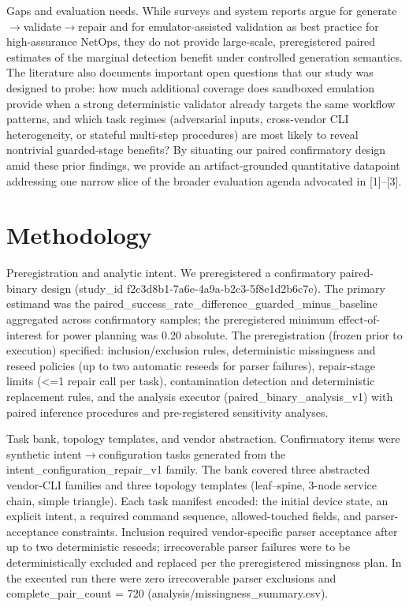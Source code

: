 \documentclass[conference]{IEEEtran}
\begin{document}
Gaps and evaluation needs. While surveys and system reports argue for generate\ensuremath{\rightarrow}validate\ensuremath{\rightarrow}repair and for emulator-assisted validation as best practice for high-assurance NetOps, they do not provide large-scale, preregistered paired estimates of the marginal detection benefit under controlled generation semantics. The literature also documents important open questions that our study was designed to probe: how much additional coverage does sandboxed emulation provide when a strong deterministic validator already targets the same workflow patterns, and which task regimes (adversarial inputs, cross‑vendor CLI heterogeneity, or stateful multi-step procedures) are most likely to reveal nontrivial guarded-stage benefits? By situating our paired confirmatory design amid these prior findings, we provide an artifact-grounded quantitative datapoint addressing one narrow slice of the broader evaluation agenda advocated in [1]--[3].

\section{Methodology}
Preregistration and analytic intent. We preregistered a confirmatory paired-binary design (study\_id f2c3d8b1-7a6e-4a9a-b2c3-5f8e1d2b6c7e). The primary estimand was the paired\_success\_rate\_difference\_guarded\_minus\_baseline aggregated across confirmatory samples; the preregistered minimum effect-of-interest for power planning was 0.20 absolute. The preregistration (frozen prior to execution) specified: inclusion/exclusion rules, deterministic missingness and reseed policies (up to two automatic reseeds for parser failures), repair-stage limits (<=1 repair call per task), contamination detection and deterministic replacement rules, and the analysis executor (paired\_binary\_analysis\_v1) with paired inference procedures and pre-registered sensitivity analyses.

Task bank, topology templates, and vendor abstraction. Confirmatory items were synthetic intent\ensuremath{\rightarrow}configuration tasks generated from the intent\_configuration\_repair\_v1 family. The bank covered three abstracted vendor‑CLI families and three topology templates (leaf--spine, 3-node service chain, simple triangle). Each task manifest encoded: the initial device state, an explicit intent, a required command sequence, allowed-touched fields, and parser-acceptance constraints. Inclusion required vendor-specific parser acceptance after up to two deterministic reseeds; irrecoverable parser failures were to be deterministically excluded and replaced per the preregistered missingness plan. In the executed run there were zero irrecoverable parser exclusions and complete\_pair\_count = 720 (analysis/missingness\_summary.csv).
\end{document}
